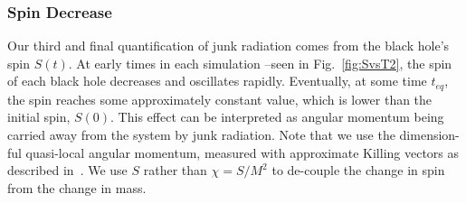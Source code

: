 \subsubsection{Spin Decrease}

Our third and final quantification of junk radiation comes from the
black hole's spin $S(t)$. At early times in each simulation --seen in Fig.~\ref{fig:SvsT2}, the spin
of each black hole decreases and oscillates rapidly. Eventually, at
some time $t_{eq}$, the spin reaches some approximately constant
value, which is lower than the initial spin, $S(0)$. This effect can
be interpreted as angular momentum being carried away from the system
by junk radiation. Note that we use the dimension-ful quasi-local
angular momentum, measured with approximate Killing vectors as
described in~\cite{Lovelace2008}. We use $S$ rather than $\chi=S/M^2$
to de-couple the change in spin from the change in mass.




